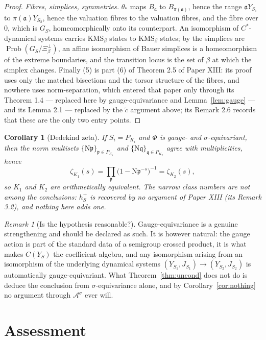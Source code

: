\documentclass[11pt]{amsart}
\numberwithin{equation}{section}
\newtheorem{corollary}[theorem]{Corollary}
\theoremstyle{definition}
\theoremstyle{remark}
\newtheorem{remark}[theorem]{Remark}
\newcommand{\cA}{\mathcal{A}}
\newcommand{\pp}{\mathfrak{p}}
\newcommand{\qq}{\mathfrak{q}}
\newcommand{\aaa}{\mathfrak{a}}
\newcommand{\Ns}{\mathrm{N}}
\begin{document}
\begin{proof}
\emph{Fibres, simplices, symmetries.} $\theta_*$ maps $B_\aaa$ to $B_{\pi(\aaa)}$, hence
the range $\aaa Y_{S_1}$ to $\pi(\aaa)Y_{S_2}$, hence the valuation fibres to the
valuation fibres, and the fibre over $0$, which is $G_S$, homeomorphically onto its
counterpart. An isomorphism of $C^*$-dynamical systems carries $\mathrm{KMS}_\beta$ states
to $\mathrm{KMS}_\beta$ states; by \cite[Thm.~3.6]{Main} the simplices are
$\operatorname{Prob}(G_S/\Xi_\beta^\perp)$, an affine isomorphism of Bauer simplices is a
homeomorphism of the extreme boundaries, and the transition locus is the set of $\beta$ at
which the simplex changes. Finally (5) is part (6) of Theorem 2.5 of Paper XIII: its proof
uses only the matched bisections and the torsor structure of the fibres, and nowhere uses
norm-separation, which entered that paper only through its Theorem 1.4 --- replaced here by
gauge-equivariance and Lemma~\ref{lem:gauge} --- and its Lemma 2.1 --- replaced by the
$\widetilde c$ argument above; its Remark 2.6 records that these are the only two entry
points.
\end{proof}

\begin{corollary}[Dedekind zeta]\label{cor:zeta}
If $S_i=P_{K_i}$ and $\Phi$ is gauge- and $\sigma$-equivariant, then the norm multisets
$\{\Ns\pp\}_{\pp\in P_{K_1}}$ and $\{\Ns\qq\}_{\qq\in P_{K_2}}$ agree with multiplicities,
hence
\[
\zeta_{K_1}(s)=\prod_{\pp}\bigl(1-\Ns\pp^{-s}\bigr)^{-1}=\zeta_{K_2}(s),
\]
so $K_1$ and $K_2$ are arithmetically equivalent. The narrow class numbers are \emph{not}
among the conclusions: $h^+_S$ is recovered by no argument of Paper XIII (its Remark 3.2),
and nothing here adds one.
\end{corollary}

\begin{remark}[Is the hypothesis reasonable?]\label{rem:reasonable}
Gauge-equivariance is a genuine strengthening and should be declared as such. It is however
natural: the gauge action is part of the standard data of a semigroup crossed product, it is
what makes $C(Y_S)$ the coefficient algebra, and any isomorphism arising from an isomorphism
of the underlying dynamical systems $(Y_{S_1},J_{S_1})\to(Y_{S_2},J_{S_2})$ is automatically
gauge-equivariant. What Theorem~\ref{thm:uncond} does not do is deduce the conclusion from
$\sigma$-equivariance alone, and by Corollary~\ref{cor:nothing} no argument through
$\cA^\sigma$ ever will.
\end{remark}

\section{Assessment}
\end{document}
